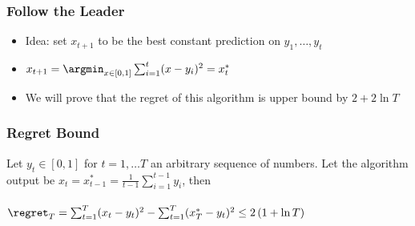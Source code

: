 \documentclass[handout]{beamer}
\begin{document}
\begin{frame}
\frametitle{Follow the Leader}
\begin{itemize}
\item Idea: set $x_{t+1}$ to be the best constant prediction on $y_1,\ldots,y_t$
\item 
  $x_{t+1} = \argmin_{x \in [0,1]} \sum_{i=1}^t (x-y_i)^2 = x^*_t$ 
\item We will prove that the regret of this algorithm is upper bound
  by $2+2 \ln T$
\end{itemize}
\end{frame}
\iffalse
\begin{frame}
\frametitle{A more general setup}
\begin{itemize}
\item General euclidean space: $\vx,\vy$ are elements in $V \subset \RR^d$
\item The loss function for time step $t$ maps $\vx$ to $\RR$:\\
  $\ell_t: V \to \RR$
\item For square loss: $\elloss{\vx}{t} = (\vx -\vy_t)^2$
\item Regret relative to $\vu \in V$:
$\regret_T = \sum_{t=1}^T \elloss{\vx_t}{t} - \sum_{t=1}^T
  \elloss{\vu}{t} $
\end{itemize}
\end{frame}

\begin{frame}
\frametitle{Technical Lemma}
\begin{lemma}
  Let $\vx_t^*$ be the minimizer of $\sum_{i=1}^t \elloss{\vx}{i}$. Then
$  \sum_{t=1}^T \elloss{\vx_t^*}{t} \leq \sum_{t=1}^T \elloss{\vx_T^*}{t}$
  \end{lemma}
\end{frame}
\fi
\begin{frame}
\frametitle{Regret Bound}
\begin{theorem}
Let $y_t \in [0,1]$ for $t=1,\ldots T$ an arbitrary sequence of
numbers. Let the algorithm output be
$ x_t = x_{t-1}^* = \frac{1}{t-1} \sum_{i=1}^{t-1} y_i$, then\\
~\\
$ \regret_T = \sum_{t=1}^T (x_t-y_t)^2 - \sum_{t=1}^T (x^*_T-y_t)^2
\leq 2 \, (1 + \ln T) $
\end{theorem}
\end{frame}
\end{document}
